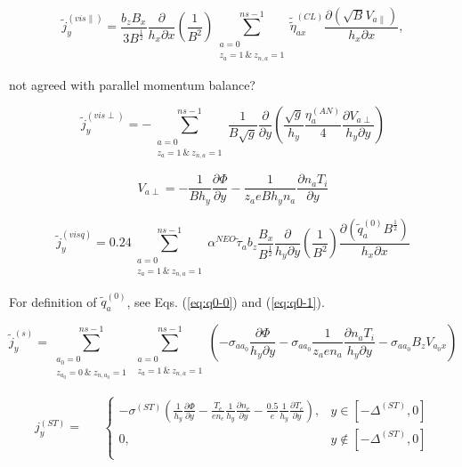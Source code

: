 \documentclass[a4paper,10pt]{report}
\begin{document}
\begin{equation}
\widetilde j_y^{(vis \parallel)} =
\frac{b_z B_x}{3 B^{\frac{1}{2}}}
\frac{\partial}{h_x \partial x}
\left( \frac{1}{B^2} \right)
\sum \limits^{ns-1}_{\substack{a = 0 \\ z_a = 1~\&~z_{n,a} = 1}}
\widetilde{\widetilde{\eta}}^{(CL)}_{ax}
\frac{\partial \left( \sqrt{B} V_{a \parallel} \right)}{h_x \partial x},
\end{equation}

not agreed with parallel momentum balance?

\begin{equation}
\widetilde j_y^{(vis \perp)} =
- \sum \limits^{ns-1}_{\substack{a = 0 \\ z_a = 1~\&~z_{n,a} = 1}}
\frac{1}{B \sqrt{g}}
\frac{\partial}{\partial y}
\left(
	\frac{\sqrt{g}}{h_y}
	\frac{\eta^{(AN)}_{a}}{4}
	\frac{\partial V_{a \perp}}{h_y \partial y}
\right)
\end{equation}


\begin{equation*}
V_{a \perp} =
- \frac 1{B h_y}\frac{\partial \Phi}{\partial y}
- \frac 1{z_a e B h_y n_a} \frac{\partial n_a T_i}{\partial y}
\end{equation*}

\begin{equation}
\widetilde j_y^{(visq)} =
0.24 \sum \limits^{ns-1}_{\substack{a = 0 \\ z_a = 1~\&~z_{n,a} = 1}}
\alpha^{NEO} \widetilde{\tau}_a b_z
\frac{B_x}{B^{\frac{1}{2}}}
\frac{\partial}{h_y \partial y}
\left( \frac{1}{B^2} \right)
\frac{\partial \left( \widetilde{q}_a^{(0)} B^{\frac{1}{2}} \right)}{h_x \partial x}
\end{equation}

For definition of $\widetilde{q}_a^{(0)}$, see Eqs. (\ref{eq:q0-0}) and (\ref{eq:q0-1}).

\begin{equation}
\widetilde j_y^{(s)} =
\sum \limits^{ns-1}_{\substack{a_0 = 0 \\ z_{a_0} = 0~\&~z_{n,a_0} = 1 }}
\sum \limits^{ns-1}_{\substack{a = 0 \\ z_a = 1~\&~z_{n,a} = 1}}
\left(
- \sigma_{aa_0} \frac{\partial \Phi}{h_y \partial y}
- \sigma_{aa_0} \frac{1}{z_a e n_a} \frac{\partial n_a T_i}{h_y \partial y}
- \sigma_{aa_0} B_z V_{a_{0}x}
\right)
\end{equation}

\begin{equation*}
\begin{matrix}
j_y^{(ST)} = &
& \left\{
\begin{matrix}
-\sigma^{(ST)}\left(
	\frac 1{h_y} \frac{\partial \Phi}{\partial y} -
	\frac{T_e}{e n_e}\frac 1{h_y} \frac{\partial n_e}{\partial y} -
	\frac{0.5}e \frac 1{h_y} \frac{\partial T_e}{\partial y}
\right)
, & y \in \left[ -\Delta^{(ST)},0 \right] \\
0, &  y \notin \left[ -\Delta^{(ST)},0 \right] \\
\end{matrix} \right.
\end{matrix}
\end{equation*}
\end{document}
